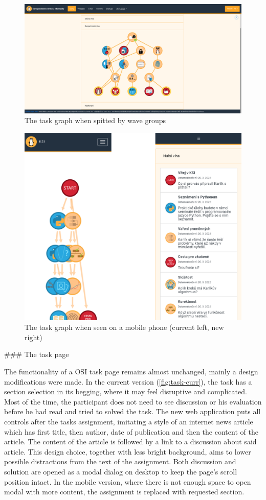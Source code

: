 \documentclass[
  digital, %
  oneside, %
  lof,     %
  lot,     %
]{fithesis4}
\begin{document}
{\begin{figure}
\includegraphics[width=\textwidth]{assets/img/graph_split}
\caption{The task graph when spitted by wave groups}
\label{fig:graph-split}
\end{figure}

\begin{figure}
\includegraphics[width=.5\textwidth]{assets/img/graph-mobile}
\caption{The task graph when seen on a mobile phone (current left, new right)}
\label{fig:graph-mobile}
\end{figure}


### The task page

The functionality of a OSI task page remains almost unchanged, mainly a design modifications were made. In the current version (\ref{fig:task-curr}), the task has a section selection in its begging, where it may feel disruptive and complicated. Most of the time, the participant does not need to see discussion or his evaluation before he had read and tried to solved the task. The new web application puts all controls after the tasks assignment, imitating a style of an internet news article which has first title, then author, date of publication and then the content of the article. The content of the article is followed by a link to a discussion about said article. This design choice, together with less bright background, aims to lower possible distractions from the text of the assignment. Both discussion and solution are opened as a modal dialog on desktop to keep the page's scroll position intact. In the mobile version, where there is not enough space to open modal with more content, the assignment is replaced with requested section.


}
\end{document}
